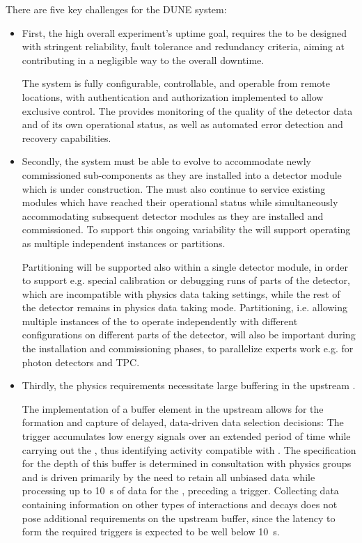 There are five key challenges for the DUNE   system: 
\begin{itemize}
\item First, the high overall experiment's uptime goal, requires the  to be designed with stringent reliability, fault tolerance and redundancy criteria, aiming at contributing in a negligible way to the overall downtime.

  The  system is fully configurable, controllable, and operable from remote locations, with authentication and authorization implemented to allow exclusive control. The  provides monitoring of the quality of the detector data and of its own operational status, as well as automated error detection and recovery capabilities.

\item Secondly, the system must be able to evolve to accommodate newly commissioned sub-components as they are installed into a detector module which is under construction. 
  The  must also continue to service existing modules which have reached their operational status while simultaneously accommodating subsequent detector modules as they are installed and commissioned. 
  To support this ongoing variability the  will support operating as multiple independent instances or partitions.

  Partitioning will be supported also within a single detector module, in order to support e.g. special calibration or debugging runs of parts of the detector, which are incompatible with physics data taking settings, while the rest of the detector remains in physics data taking mode. Partitioning, i.e. allowing multiple instances of the  to operate independently with different configurations on different parts of the detector, will also be important during the installation and commissioning phases, to parallelize experts work e.g. for photon detectors and TPC.

\item Thirdly, the  physics requirements necessitate large buffering in the upstream . 

  The implementation of a buffer element in the upstream  allows
  for the formation and capture of delayed, data-driven data selection
  decisions:
  The trigger accumulates low energy signals over an extended period
  of time while carrying out the , thus identifying activity compatible with .
  The specification for the depth of this buffer is determined in
  consultation with physics groups and is driven primarily by the need
  to retain all unbiased data while processing up to \SI{10}{s} of
  data for the , preceding a  trigger.
  Collecting data containing information on other types of interactions and decays does not pose additional requirements on the upstream  buffer, since the latency to form the required triggers is expected to be well below \SI{10}{s}.


\end{itemize}
